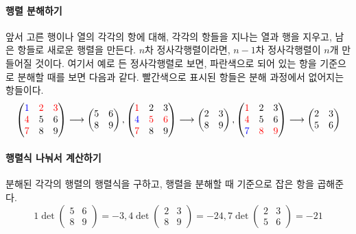 \documentclass{scrartcl}
\begin{document}
\paragraph{행렬 분해하기} 앞서 고른 행이나 열의 각각의 항에 대해, 각각의 항들을 지나는 열과 행을 지우고, 남은 항들로 새로운 행렬을 만든다. $n$차 정사각행렬이라면, $n-1$차 정사각행렬이 $n$개 만들어질 것이다. 여기서 예로 든 정사각행렬로 보면, 파란색으로 되어 있는 항을 기준으로 분해할 때를 보면 다음과 같다. 빨간색으로 표시된 항들은 분해 과정에서 없어지는 항들이다.
\[
\begin{pmatrix}
\color{blue}1 & \color{red}2 & \color{red}3\\
\color{red}4 & 5 & 6\\
\color{red}7 & 8 & 9
\end{pmatrix}\longrightarrow\begin{pmatrix}
5 & 6\\
8 & 9
\end{pmatrix},
\begin{pmatrix}
\color{red}1 & 2 & 3\\
\color{blue}4 & \color{red}5 & \color{red}6\\
\color{red}7 & 8 & 9
\end{pmatrix}\longrightarrow\begin{pmatrix}
2 & 3\\
8 & 9
\end{pmatrix},
\begin{pmatrix}
\color{red}1 & 2 & 3\\
\color{red}4 & 5 & 6\\
\color{blue}7 & \color{red}8 & \color{red}9
\end{pmatrix}\longrightarrow\begin{pmatrix}
2 & 3\\
5 & 6
\end{pmatrix}
\]
\paragraph{행렬식 나눠서 계산하기} 분해된 각각의 행렬의 행렬식을 구하고, 행렬을 분해할 때 기준으로 잡은 항을 곱해준다.
\[
1\det\begin{pmatrix}
5 & 6\\
8 & 9
\end{pmatrix}=-3,
4\det\begin{pmatrix}
2 & 3\\
8 & 9
\end{pmatrix}=-24,
7\det\begin{pmatrix}
2 & 3\\
5 & 6
\end{pmatrix}=-21
\]
\end{document}

